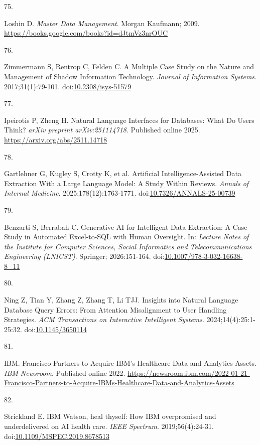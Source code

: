 \documentclass[
  american,
  11pt,
  letterpaper,
  oneside  ,captions=tableheading
]{scrartcl}
\newlength{\cslhangindent}
\newlength{\csllabelwidth}
\newenvironment{CSLReferences}[2] %
 {\begin{list}{}{%
  \setlength{\itemindent}{0pt}
  \setlength{\leftmargin}{0pt}
  \setlength{\parsep}{0pt}
  \ifodd #1
   \setlength{\leftmargin}{\cslhangindent}
   \setlength{\itemindent}{-1\cslhangindent}
  \fi
  \setlength{\itemsep}{#2\baselineskip}}}
 {\end{list}}
\newcommand{\CSLLeftMargin}[1]{\parbox[t]{\csllabelwidth}{\strut#1\strut}}
\newcommand{\CSLRightInline}[1]{\parbox[t]{\linewidth - \csllabelwidth}{\strut#1\strut}}
\begin{document}
\begin{CSLReferences}{0}{1}
\CSLLeftMargin{75. }%
\CSLRightInline{Loshin D. \emph{{Master Data Management}}. Morgan
Kaufmann; 2009. \url{https://books.google.com/books?id=dJtmVz3nrOUC}}

\CSLLeftMargin{76. }%
\CSLRightInline{Zimmermann S, Rentrop C, Felden C. {A Multiple Case
Study on the Nature and Management of Shadow Information Technology}.
\emph{Journal of Information Systems}. 2017;31(1):79-101.
doi:\href{https://doi.org/10.2308/isys-51579}{10.2308/isys-51579}}

\CSLLeftMargin{77. }%
\CSLRightInline{Ipeirotis P, Zheng H. {Natural Language Interfaces for
Databases: What Do Users Think?} \emph{arXiv preprint arXiv:251114718}.
Published online 2025. \url{https://arxiv.org/abs/2511.14718}}

\CSLLeftMargin{78. }%
\CSLRightInline{Gartlehner G, Kugley S, Crotty K, et al. {Artificial
Intelligence-Assisted Data Extraction With a Large Language Model: A
Study Within Reviews}. \emph{Annals of Internal Medicine}.
2025;178(12):1763-1771.
doi:\href{https://doi.org/10.7326/ANNALS-25-00739}{10.7326/ANNALS-25-00739}}

\CSLLeftMargin{79. }%
\CSLRightInline{Benzarti S, Berrabah C. {Generative AI for Intelligent
Data Extraction: A Case Study in Automated Excel-to-SQL with Human
Oversight}. In: \emph{Lecture Notes of the Institute for Computer
Sciences, Social Informatics and Telecommunications Engineering
(LNICST)}. Springer; 2026:151-164.
doi:\href{https://doi.org/10.1007/978-3-032-16638-8_11}{10.1007/978-3-032-16638-8\_11}}

\CSLLeftMargin{80. }%
\CSLRightInline{Ning Z, Tian Y, Zhang Z, Zhang T, Li TJJ. {Insights into
Natural Language Database Query Errors: From Attention Misalignment to
User Handling Strategies}. \emph{ACM Transactions on Interactive
Intelligent Systems}. 2024;14(4):25:1-25:32.
doi:\href{https://doi.org/10.1145/3650114}{10.1145/3650114}}

\CSLLeftMargin{81. }%
\CSLRightInline{IBM. {Francisco Partners to Acquire IBM's Healthcare
Data and Analytics Assets}. \emph{{IBM} Newsroom}. Published online
2022.
\url{https://newsroom.ibm.com/2022-01-21-Francisco-Partners-to-Acquire-IBMs-Healthcare-Data-and-Analytics-Assets}}

\CSLLeftMargin{82. }%
\CSLRightInline{Strickland E. {IBM Watson, heal thyself: How IBM
overpromised and underdelivered on AI health care}. \emph{IEEE
Spectrum}. 2019;56(4):24-31.
doi:\href{https://doi.org/10.1109/MSPEC.2019.8678513}{10.1109/MSPEC.2019.8678513}}


\end{CSLReferences}
\end{document}
